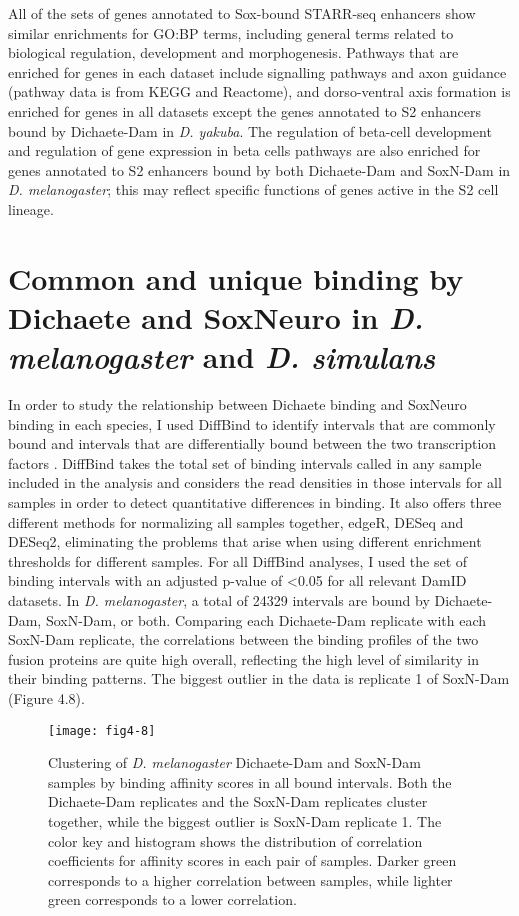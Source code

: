 All of the sets of genes annotated to Sox-bound STARR-seq enhancers show similar enrichments for GO:BP terms, including general terms related to biological regulation, development and morphogenesis. Pathways that are enriched for genes in each dataset include signalling pathways and axon guidance (pathway data is from KEGG and Reactome), and dorso-ventral axis formation is enriched for genes in all datasets except the genes annotated to S2 enhancers bound by Dichaete-Dam in \emph{D. yakuba}. The regulation of beta-cell development and regulation of gene expression in beta cells pathways are also enriched for genes annotated to S2 enhancers bound by both Dichaete-Dam and SoxN-Dam in \emph{D. melanogaster}; this may reflect specific functions of genes active in the S2 cell lineage.

\section{Common and unique binding by Dichaete and SoxNeuro in \emph{D. melanogaster} and \emph{D. simulans}}
In order to study the relationship between Dichaete binding and SoxNeuro binding in each species, I used DiffBind to identify intervals that are commonly bound and intervals that are differentially bound between the two transcription factors \citep{ross-innes_differential_2012}. DiffBind takes the total set of binding intervals called in any sample included in the analysis and considers the read densities in those intervals for all samples in order to detect quantitative differences in binding. It also offers three different methods for normalizing all samples together, edgeR, DESeq and DESeq2, eliminating the problems that arise when using different enrichment thresholds for different samples. For all DiffBind analyses, I used the set of binding intervals with an adjusted p-value of \textless 0.05 for all relevant DamID datasets. In \emph{D. melanogaster}, a total of 24329 intervals are bound by Dichaete-Dam, SoxN-Dam, or both. Comparing each Dichaete-Dam replicate with each SoxN-Dam replicate, the correlations between the binding profiles of the two fusion proteins are quite high overall, reflecting the high level of similarity in their binding patterns. The biggest outlier in the data is replicate 1 of SoxN-Dam (Figure 4.8).\\ 

\begin{figure}[H]
\centering
\texttt{[image: fig4-8]}
\caption{Clustering of \emph{D. melanogaster} Dichaete-Dam and SoxN-Dam samples by binding affinity scores in all bound intervals. Both the Dichaete-Dam replicates and the SoxN-Dam replicates cluster together, while the biggest outlier is SoxN-Dam replicate 1. The color key and histogram shows the distribution of correlation coefficients for affinity scores in each pair of samples. Darker green corresponds to a higher correlation between samples, while lighter green corresponds to a lower correlation.}
\label{Figure 4.8}
\end{figure}

